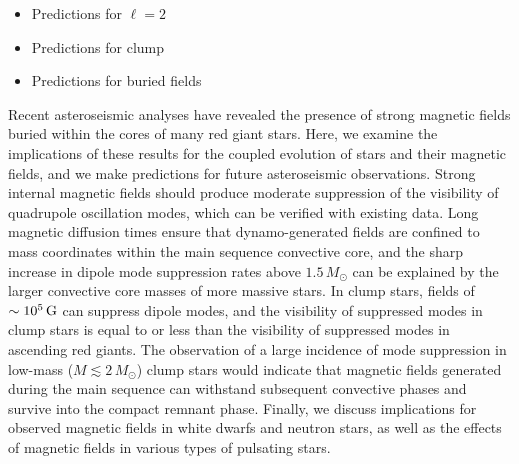 \begin{itemize}
\item Predictions for $\ell = 2$
\item Predictions for clump 
\item Predictions for buried fields
\end{itemize}



Recent asteroseismic analyses have revealed the presence of strong magnetic fields buried within the cores of many red giant stars. Here, we examine the implications of these results for the coupled evolution of stars and their magnetic fields, and we make predictions for future asteroseismic observations. Strong internal magnetic fields should produce moderate suppression of the visibility of quadrupole oscillation modes, which can be verified with existing data. Long magnetic diffusion times ensure that dynamo-generated fields are confined to mass coordinates within the main sequence convective core, and the sharp increase in dipole mode suppression rates above $1.5 \, M_\odot$ can be explained by the larger convective core masses of more massive stars.
In clump stars, fields of $\sim 10^5 \, {\rm G}$ can suppress dipole modes, and the visibility of suppressed modes in clump stars is equal to or less than the visibility of suppressed modes in ascending red giants. The observation of a large incidence of mode suppression in low-mass ($M \lesssim 2 \, M_\odot$) clump stars would indicate that magnetic fields generated during the main sequence can withstand subsequent convective phases and survive into the compact remnant phase. Finally, we discuss implications for observed magnetic fields in white dwarfs and neutron stars, as well as the effects of magnetic fields in various types of pulsating stars.
  
  
  
  